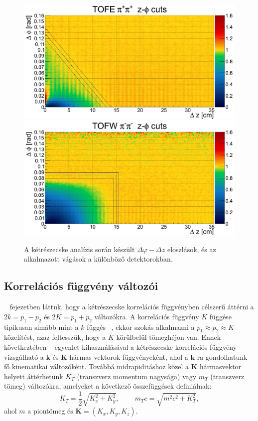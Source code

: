 \documentclass[11pt,a4paper]{article}
\numberwithin{equation}{subsection}
\numberwithin{figure}{section}
\begin{document}
\begin{figure}[H]
\includegraphics[scale=0.17]{pic/dat/kd/Corr_TOFE_dzdp_pp.png}
\includegraphics[scale=0.17]{pic/dat/kd/Corr_TOFW_dzdp_mm.png}
\caption{A kétrészecske analízis során készült $\Delta\varphi-\Delta z$ eloszlások, és az alkalmazott vágások a különböző detektorokban.}
\label{fig:paircuts}
\end{figure}


\subsection{Korrelációs függvény változói}

~ fejezetben láttuk, hogy a kétrészecske korrelációs függvényben célszerű áttérni a $2k=p_1-p_2$ és $2K=p_1+p_2$ változókra. A korrelációs függvény  $K$ függése tipikusan simább mint a $k$ függés ~\cite{Lisa:2005dd}, ekkor szokás alkalmazni a $p_1\approx p_2\approx K$ közelítést, azaz feltesszük, hogy a $K$ körülbelül tömeghéjon van. Ennek következtében ~ egyenlet kihasználásával a kétrészecske korrelációs függvény vizsgálható a $\bm{k}$ és $\bm{K}$ hármas vektorok függvényeként, ahol a $\bm{k}$-ra gondolhatunk fő kinematikai változóként. Továbbá midrapiditáshoz közel a $\bm{K}$ hármasvektor helyett áttérhetünk $K_T$ (transzverz momentum nagysága) vagy $m_T$ (transzverz tömeg) változókra, amelyeket a következő összefüggések definiálnak:
\begin{equation}
K_T = \frac{1}{2}\sqrt{K_x^2+K_y^2},\;\;\;\;\;\;\;\;
m_Tc = \sqrt{m^2c^2+K_T^2},
\end{equation}
ahol $m$ a piontömeg és $\bm{K}=(K_x, K_y, K_z)$.
\end{document}
